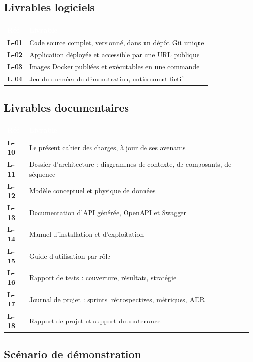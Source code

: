 \documentclass[11pt,a4paper]{article}
\newcommand{\rid}[1]{{\sffamily\bfseries\footnotesize\color{primary}#1}}
\newcommand{\hd}[1]{\textcolor{white}{\sffamily\bfseries\small #1}}
\newcommand{\rowhead}{\rowcolor{primary}}
\begin{document}
\subsection{Livrables logiciels}

\noindent
\begin{tabularx}{\textwidth}{@{}C{1.5cm} L@{}}
\toprule
\rowhead \hd{Réf.} & \hd{Livrable} \\
\midrule
\rid{L-01} & Code source complet, versionné, dans un dépôt Git unique \\
\rid{L-02} & Application déployée et accessible par une URL publique \\
\rid{L-03} & Images Docker publiées et exécutables en une commande \\
\rid{L-04} & Jeu de données de démonstration, entièrement fictif \\
\bottomrule
\end{tabularx}

\subsection{Livrables documentaires}

\noindent
\begin{tabularx}{\textwidth}{@{}C{1.5cm} L@{}}
\toprule
\rowhead \hd{Réf.} & \hd{Livrable} \\
\midrule
\rid{L-10} & Le présent cahier des charges, à jour de ses avenants \\
\rid{L-11} & Dossier d'architecture : diagrammes de contexte, de composants, de séquence \\
\rid{L-12} & Modèle conceptuel et physique de données \\
\rid{L-13} & Documentation d'API générée, OpenAPI et Swagger \\
\rid{L-14} & Manuel d'installation et d'exploitation \\
\rid{L-15} & Guide d'utilisation par rôle \\
\rid{L-16} & Rapport de tests : couverture, résultats, stratégie \\
\rid{L-17} & Journal de projet : sprints, rétrospectives, métriques, ADR \\
\rid{L-18} & Rapport de projet et support de soutenance \\
\bottomrule
\end{tabularx}

\subsection{Scénario de démonstration}
\end{document}

